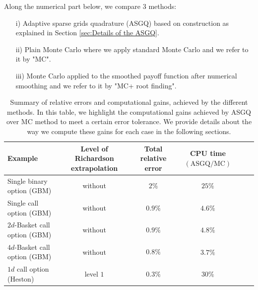 Along the numerical part below, we compare $3$ methods:
\begin{enumerate}
\item[i)] Adaptive sparse grids quadrature (ASGQ) based on construction as explained in Section \ref{sec:Details of the ASGQ}.
\item[ii)] Plain Monte Carlo where we apply standard Monte Carlo and we refer to it by "MC".
\item[iii)] Monte Carlo applied to the smoothed payoff function after numerical smoothing and we refer to it by "MC+ root finding".
\end{enumerate}
\FloatBarrier
\begin{table}[!h]
	\centering
	\begin{small}
	\begin{tabular}{l*{4}{c}r}
	\toprule[1.5pt]
		Example          & Level of Richardson extrapolation    &  Total relative error  & CPU time  $\left( \text{ASGQ} / \text{MC}\right)$ \\
		\hline
			  Single binary option (GBM) & without  &  $2 \%$&  $ 25\%$ \\	
              \hline
            Single call option (GBM)  & without    &  $0.9\%$&  $4.6\%$ \\
				 \hline
					$2d$-Basket call option (GBM)  & without    &  $$0.9\%$$&  $4.8\%$ \\	
					\hline
					$4d$-Basket call option (GBM)  & without    &  $$0.8\%$$&  $3.7\%$ \\	
					\hline
					$1d$ call option (Heston) &level $1$    &  $$0.3\%$$&  $30\%$ \\
		\bottomrule[1.25pt]
	\end{tabular}
\end{small}
	\caption{Summary of relative errors and computational gains, achieved by the different methods. In this table, we highlight the computational gains achieved by ASGQ over MC method to meet a certain error tolerance. We provide details about the way we compute these gains for each case in the following sections.}
	\label{table:Summary of our numerical results.}
\end{table}
\FloatBarrier

